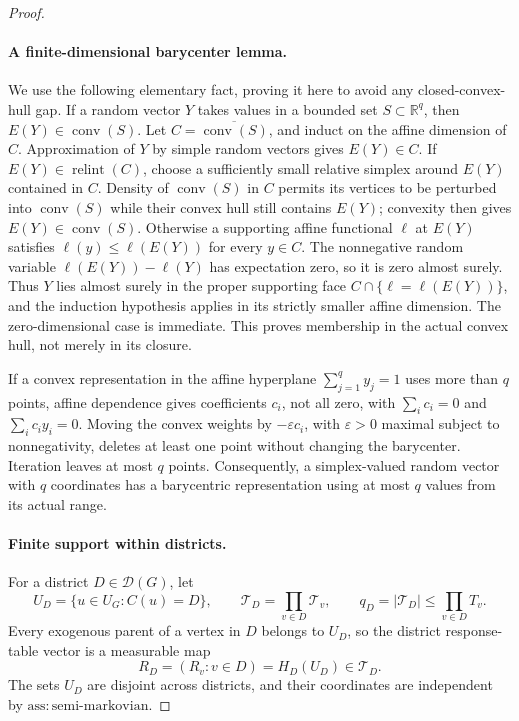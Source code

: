\documentclass{article}
\begin{document}
\begin{proof}
\paragraph{A finite-dimensional barycenter lemma.}
We use the following elementary fact, proving it here to avoid any closed-convex-hull gap.  If a random vector \(Y\) takes values in a bounded set \(S\subset\mathbb R^q\), then \(E(Y)\in\operatorname{conv}(S)\).  Let \(C=\overline{\operatorname{conv}(S)}\), and induct on the affine dimension of \(C\).  Approximation of \(Y\) by simple random vectors gives \(E(Y)\in C\).  If \(E(Y)\in\operatorname{relint}(C)\), choose a sufficiently small relative simplex around \(E(Y)\) contained in \(C\).  Density of \(\operatorname{conv}(S)\) in \(C\) permits its vertices to be perturbed into \(\operatorname{conv}(S)\) while their convex hull still contains \(E(Y)\); convexity then gives \(E(Y)\in\operatorname{conv}(S)\).  Otherwise a supporting affine functional \(\ell\) at \(E(Y)\) satisfies \(\ell(y)\le \ell(E(Y))\) for every \(y\in C\).  The nonnegative random variable \(\ell(E(Y))-\ell(Y)\) has expectation zero, so it is zero almost surely.  Thus \(Y\) lies almost surely in the proper supporting face \(C\cap\{\ell=\ell(E(Y))\}\), and the induction hypothesis applies in its strictly smaller affine dimension.  The zero-dimensional case is immediate.  This proves membership in the actual convex hull, not merely in its closure.

If a convex representation in the affine hyperplane \(\sum_{j=1}^q y_j=1\) uses more than \(q\) points, affine dependence gives coefficients \(c_i\), not all zero, with \(\sum_i c_i=0\) and \(\sum_i c_i y_i=0\).  Moving the convex weights by \(-\varepsilon c_i\), with \(\varepsilon>0\) maximal subject to nonnegativity, deletes at least one point without changing the barycenter.  Iteration leaves at most \(q\) points.  Consequently, a simplex-valued random vector with \(q\) coordinates has a barycentric representation using at most \(q\) values from its actual range.

\paragraph{Finite support within districts.}
For a district \(D\in\mathcal D(G)\), let
\[
 U_D=\{u\in U_G:C(u)=D\},
 \qquad
 \mathcal T_D=\prod_{v\in D}\mathcal T_v,
 \qquad
 q_D=|\mathcal T_D|\le\prod_{v\in D}T_v.
\]
Every exogenous parent of a vertex in \(D\) belongs to \(U_D\), so the district response-table vector is a measurable map
\[
 R_D=(R_v:v\in D)=H_D(U_D)\in\mathcal T_D.
\]
The sets \(U_D\) are disjoint across districts, and their coordinates are independent by \(\mathrm{ass:semi\text{-}markovian}\).


\end{proof}
\end{document}
